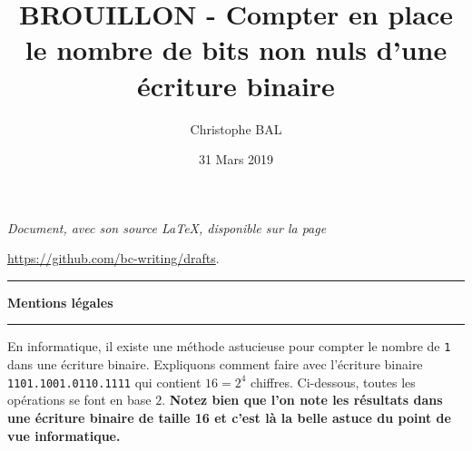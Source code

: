 \documentclass[12pt]{amsart}
\begin{document}
\title{BROUILLON - Compter en place le nombre de bits non nuls d'une écriture binaire}
\author{Christophe BAL}
\date{31 Mars 2019}

\maketitle

\begin{center}
	\itshape
	Document, avec son source \LaTeX, disponible sur la page
	
	\url{https://github.com/bc-writing/drafts}.
\end{center}


\bigskip


\begin{center}
	\hrule\vspace{.3em}
	{
		\fontsize{1.35em}{1em}\selectfont
		\textbf{Mentions \og légales \fg}
	}
			
	\vspace{0.45em}
	\doclicenseThis
	\hrule
\end{center}


\bigskip


En informatique, il existe une méthode astucieuse pour compter le nombre de \verb+1+ dans une écriture binaire.
Expliquons comment faire avec l'écriture binaire \verb+1101.1001.0110.1111+ qui contient $16 = 2^4$ chiffres. Ci-dessous, toutes les opérations se font en base $2$. 
\textbf{Notez bien que l'on note les résultats dans une écriture binaire  de taille 16 et c'est là la belle astuce du point de vue informatique.}
\end{document}
